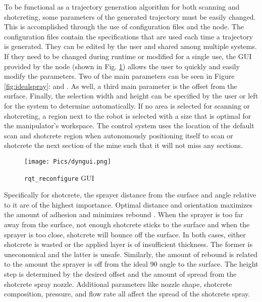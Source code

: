 To be functional as a trajectory generation algorithm for both scanning and shotcreting, some parameters of the generated trajectory must be easily changed. This is accomplished through the use of configuration files and the  node. The configuration files contain the specifications that are used each time a trajectory is generated. They can be edited by the user and shared among multiple systems. If they need to be changed during runtime or modified for a single use, the GUI provided by the  node (shown in Fig. \ref{fig:dyngui}) allows the user to quickly and easily modify the parameters. Two of the main parameters can be seen in Figure \ref{fig:idealspray}:  and . As well, a third main parameter is the offset from the surface. Finally, the selection width and height can be specified by the user or left for the system to determine automatically. If no area is selected for scanning or shotcreting, a region next to the robot is selected with a size that is optimal for the manipulator's workspace. The control system uses the location of the default scan and shotcrete region when autonomously positioning itself to scan or shotcrete the next section of the mine such that it will not miss any sections.\\

\begin{figure}[h]
    \centering
    \texttt{[image: Pics/dyngui.png]}
    \caption{\texttt{rqt\_reconfigure} GUI}
    \label{fig:dyngui}
\end{figure}

Specifically for shotcrete, the sprayer distance from the surface and angle relative to it are of the highest importance. Optimal distance and orientation maximizes the amount of adhesion and minimizes rebound  \cite{spraypat}. When the sprayer is too far away from the surface, not enough shotcrete sticks to the surface and when the sprayer is too close, shotcrete will bounce off the surface. In both cases, either shotcrete is wasted or the applied layer is of insufficient thickness. The former is uneconomical and the latter is unsafe. Similarly, the amount of rebound is related to the amount the sprayer is off from the ideal 90\degree\hspace{0pt} angle to the surface. The height step is determined by the desired offset and the amount of spread from the shotcrete spray nozzle.  Additional parameters like nozzle shape, shotcrete composition, pressure, and flow rate all affect the spread of the shotcrete spray.\\

